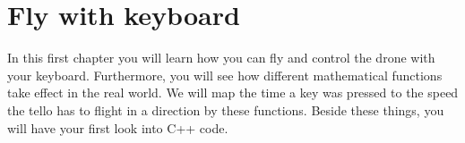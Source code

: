 \newpage
\chapter{Fly with keyboard}
In this first chapter you will learn how you can fly and control the drone with your keyboard.
Furthermore, you will see how different mathematical functions take effect in the real world.
We will map the time a key was pressed to the speed the tello has to flight in a direction by these functions.
Beside these things, you will have your first look into C++ code.



